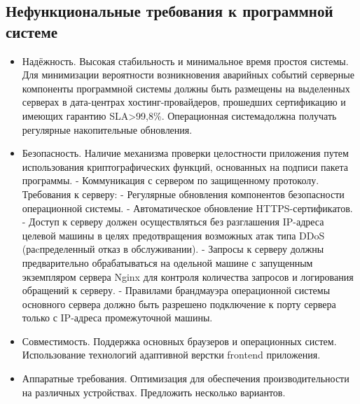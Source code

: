\subsection{Нефункциональные требования к программной системе}

\begin{itemize}
    \item Надёжность. Высокая стабильность и минимальное время простоя системы. Для минимизации вероятности возникновения аварийных событий серверные компоненты программной системы должны быть размещены на выделенных серверах в дата-центрах хостинг-провайдеров, прошедших сертификацию и имеющих гарантию SLA>99,8\%. Операционная системадолжна получать регулярные накопительные обновления.
    \item Безопасность. Наличие механизма проверки целостности приложения путем использования криптографических функций, основанных на подписи пакета программы. - Коммуникация с сервером по защищенному протоколу. Требования к серверу: - Регулярные обновления компонентов безопасности операционной системы. - Автоматическое обновление HTTPS-сертификатов. - Доступ к серверу должен осуществляться без разглашения IP-адреса целевой машины в целях предотвращения возможных атак типа DDoS (раcпределенный отказ в обслуживании). - Запросы к серверу должны предварительно обрабатываться на одельной машине с запущенным экземпляром сервера Nginx для контроля количества запросов и логирования обращений к серверу. - Правилами брандмауэра операционной системы основного сервера должно быть разрешено подключение к порту сервера только с IP-адреса промежуточной машины.
    \item Совместимость. Поддержка основных браузеров и операционных систем. Использование технологий адаптивной верстки frontend приложения.
    \item Аппаратные требования. Оптимизация для обеспечения производительности на различных устройствах. Предложить несколько вариантов.
\end{itemize}
